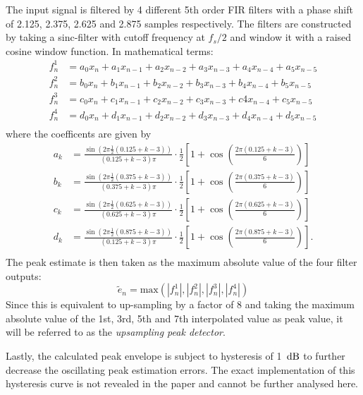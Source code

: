 \documentclass[../main2.tex]{subfiles}
\begin{document}
The input signal is filtered by 4 different 5th order FIR filters with a phase shift of 2.125, 2.375, 2.625 and 2.875 samples respectively. The filters are constructed by taking a sinc-filter with cutoff frequency at $f_s/2$ and window it with a raised cosine window function. In mathematical terms:
\begin{equation}
\begin{split}
f^1_n &= a_0 x_{n} + a_1 x_{n-1} + a_2 x_{n-2} + a_3 x_{n-3} + a_4 x_{n-4} + a_5 x_{n-5} \\
f^2_n &= b_0 x_{n} + b_1 x_{n-1} + b_2 x_{n-2} + b_3 x_{n-3} + b_4 x_{n-4} + b_5 x_{n-5} \\
f^3_n &= c_0 x_{n} + c_1 x_{n-1} + c_2 x_{n-2} + c_3 x_{n-3} + c4 x_{n-4} + c_5 x_{n-5} \\
f^4_n &= d_0 x_{n} + d_1 x_{n-1} + d_2 x_{n-2} + d_3 x_{n-3} + d_4 x_{n-4} + d_5 x_{n-5} \\
\end{split}
\end{equation}
where the coefficents are given by
\begin{equation}
\begin{split}
a_k &= \frac{\sin (2 \pi \frac{1}{2} (0.125+k-3) )}{(0.125+k-3)\pi} \cdot \frac{1}{2}\left[1+\cos \left(\frac{2 \pi (0.125+k-3)}{6} \right) \right] \\
b_k &= \frac{\sin (2 \pi \frac{1}{2} (0.375+k-3) )}{(0.375+k-3)\pi} \cdot \frac{1}{2}\left[1+\cos \left(\frac{2 \pi (0.375+k-3)}{6} \right) \right] \\
c_k &= \frac{\sin (2 \pi \frac{1}{2} (0.625+k-3) )}{(0.625+k-3)\pi} \cdot \frac{1}{2}\left[1+\cos \left(\frac{2 \pi (0.625+k-3)}{6} \right) \right] \\
d_k &= \frac{\sin (2 \pi \frac{1}{2} (0.875+k-3) )}{(0.125+k-3)\pi} \cdot \frac{1}{2}\left[1+\cos \left(\frac{2 \pi (0.875+k-3)}{6} \right) \right]. \\
\end{split}
\end{equation}
The peak estimate is then taken as the maximum absolute value of the four filter outputs:
\begin{equation}
\tilde{e}_n = \text{max}(|f^1_n|, |f^2_n|, |f^3_n|, |f^4_n|)
\end{equation}
Since this is equivalent to up-sampling by a factor of 8 and taking the maximum absolute value of the 1st, 3rd, 5th and 7th interpolated value as peak value, it will be referred to as the \emph{upsampling peak detector}.

Lastly, the calculated peak envelope is subject to hysteresis of 1 $\mskip3mu\text{dB}$ to further decrease the oscillating peak estimation errors. The exact implementation of this hysteresis curve is not revealed in the paper and cannot be further analysed here.
\end{document}
